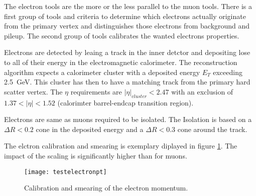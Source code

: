 The electron tools are the more or the less parallel to the muon tools. There is a first group of tools and criteria to determine which electrons actually originate from the primary vertex and distinguishes those electrons from background and pileup. The second group of tools calibrates the wanted electrons properties.

Electrons are detected by leaing a track in the inner detctor and depositing lose to all of their energy in the electromagnetic calorimeter. The reconstruction algorithm expects a calorimeter cluster with a deposited energy $E_T$ exceeding \SI{2.5}{\GeV}. This cluster has then to have a matching track from the primary hard scatter vertex. The $\eta$ requirements are $|\eta|_{cluster} < 2.47$ with an exclusion of $\num{1.37} < |\eta| < \num{1.52}$ (calorimter barrel-endcap transition region).

Electrons are same as muons required to be isolated. The Isolation is based on a $\Delta R < \num{0.2}$ cone in the deposited energy and a $\Delta R < \num{0.3}$ cone around the track.

The elctron calibration and smearing is exemplary diplayed in figure \ref{fig:testelectronpt}. The impact of the scaling is significantly higher than for muons.

\begin{figure}
\centering
\texttt{[image: testelectronpt]}
\caption{Calibration and smearing of the electron momentum.}
\label{fig:testelectronpt}
\end{figure}